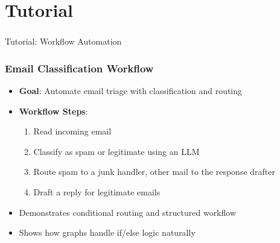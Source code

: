 \section[Tutorial]{Tutorial}
\begin{frame}[fragile]\frametitle{}
\begin{center}
{\Large Tutorial: Workflow Automation}
\end{center}
\end{frame}
\begin{frame}[fragile]\frametitle{Email Classification Workflow}
      \begin{itemize}
        \item \textbf{Goal}: Automate email triage with classification and routing
        \item \textbf{Workflow Steps}:
        \begin{enumerate}
            \item Read incoming email
            \item Classify as spam or legitimate using an LLM
            \item Route spam to a junk handler, other mail to the response drafter
            \item Draft a reply for legitimate emails
        \end{enumerate}
        \item Demonstrates conditional routing and structured workflow
        \item Shows how graphs handle if/else logic naturally
      \end{itemize}
\end{frame}
